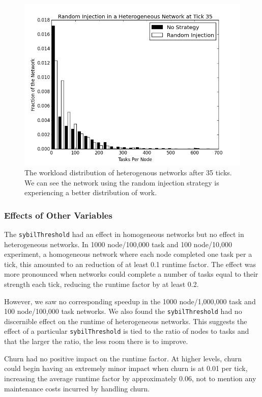 \documentclass[10pt,conference]{IEEEtran}
\begin{document}
	
	\begin{figure}
		\centering
		\includegraphics[width=0.9\linewidth]{figs/randomStableHistHetero35}
		\caption[Random injection in a Heterogenous Network]{The workload distribution of heterogenous networks after 35 ticks.  We can see the network using the random injection strategy is experiencing a better distribution of work.}
		\label{fig:randomStableHistHetero35}
	\end{figure}
	
	
	
	\subsubsection{Effects of Other Variables}
	
	The \texttt{sybilThreshold} had an effect in homogeneous networks but no effect in heterogeneous networks.
	In 1000 node/100,000 task and 100 node/10,000 experiment, a homogeneous network where each node completed one task per a tick, this amounted to an reduction of at least 0.1 runtime factor.
	The effect was more pronounced when networks could complete a number of tasks equal to their strength each tick, reducing the runtime factor by at least 0.2.
	
	However, we saw no corresponding speedup in the 1000 node/1,000,000 task and 100 node/100,000 task networks.
	We also found the \texttt{sybilThreshold} had no discernible effect on the runtime of heterogeneous networks.
	This suggests the effect of a particular \texttt{sybilThreshold} is tied to the ratio of nodes to tasks and that the larger the ratio, the less room there is to improve.
	
	Churn had no positive impact on the runtime factor.
	At higher levels, churn could begin having an extremely minor impact when churn is at 0.01 per tick, increasing the average runtime factor by approximately 0.06, not to mention any maintenance costs incurred by handling churn.
	
\end{document}
